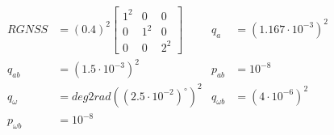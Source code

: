 \begin{align}
        RGNSS &= (0.4)^2\begin{bmatrix}
    1^2 & 0 & 0 \\
    0 & 1^2 & 0 \\
    0 & 0 & 2^2
\end{bmatrix} & q_a &= (1.167 \cdot 10^{-3})^2 \label{eq:eskf-sim-tuning1} \\
        q_{ab} &= (1.5 \cdot 10^{-3})^2 & p_{ab} &= 10^{-8} \label{eq:eskf-sim-tuning2} \\
        q_\omega &= deg2rad((2.5 \cdot 10^{-2})^\circ)^2  & q_{\omega b} &= (4 \cdot 10^{-6})^2 \label{eq:eskf-sim-tuning3} \\
        p_{\omega b} &= 10^{-8} \label{eq:eskf-sim-tuning4}
\end{align}

